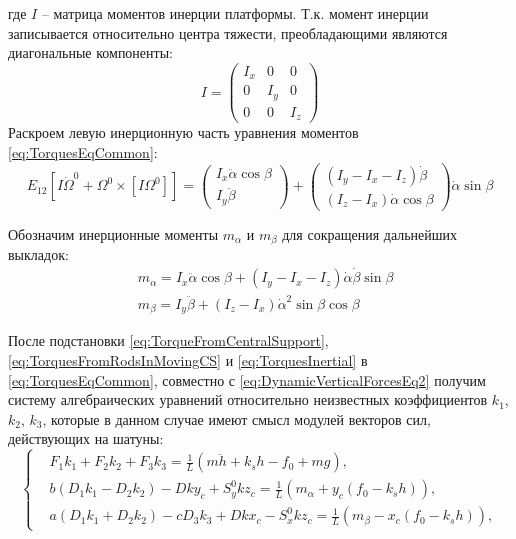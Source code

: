 где $I$ – матрица моментов инерции платформы. Т.к. момент инерции записывается относительно центра тяжести, преобладающими являются диагональные компоненты:
\begin{equation}
I = \begin{pmatrix}
I_x & 0 & 0 \\ 0 & I_y & 0 \\ 0 & 0 & I_z
\end{pmatrix}
\end{equation}
Раскроем левую инерционную часть уравнения моментов \ref{eq:TorquesEqCommon}:
\begin{equation}
\label{eq:TorquesEqLeftInertialPart}
E_{12}\left[I\dot{\Omega}^0 + \Omega^0 \times \left[I\Omega^0\right] \right] = \begin{pmatrix}I_x\ddot{\alpha}\cos{\beta} \\ I_y\ddot{\beta}\end{pmatrix} +
\begin{pmatrix}\left(I_y-I_x-I_z\right)\dot{\beta} \\ \left(I_z-I_x\right)\dot{\alpha}\cos{\beta}\end{pmatrix}\dot{\alpha}\sin{\beta}
\end{equation}

Обозначим инерционные моменты $m_{\alpha}$ и $m_\beta$ для сокращения дальнейших выкладок:
\begin{equation}
\label{eq:TorquesInertial}
\begin{aligned}
& m_{\alpha} = I_x\ddot{\alpha}\cos{\beta} + \left(I_y-I_x-I_z\right)\dot{\alpha}\dot{\beta}\sin{\beta} \\
& m_{\beta} = I_y\ddot{\beta} + \left(I_z-I_x\right)\dot{\alpha}^2\sin{\beta}\cos{\beta}
\end{aligned}
\end{equation}

После подстановки \ref{eq:TorqueFromCentralSupport}, \ref{eq:TorquesFromRodsInMovingCS} и \ref{eq:TorquesInertial} в \ref{eq:TorquesEqCommon}, совместно с \ref{eq:DynamicVerticalForcesEq2} получим систему алгебраических уравнений относительно неизвестных коэффициентов $k_1$, $k_2$, $k_3$, которые в данном случае имеют смысл модулей векторов сил, действующих на шатуны:
\begin{equation}
\label{eq:KoefsLinearSystem1}
\left\{
\begin{aligned}
& F_1k_1 + F_2k_2 + F_3k_3 = \frac{1}{L}\left(m\ddot{h}+k_sh-f_0+mg\right), \\
& b\left(D_1k_1-D_2k_2\right)-Dky_c + S_y^0kz_c = \frac{1}{L}\left(m_{\alpha} + y_c\left(f_0 - k_sh\right)\right), \\
& a\left(D_1k_1+D_2k_2\right)-cD_3k_3+Dkx_c-S_x^0kz_c = \frac{1}{L}\left(m_{\beta} - x_c\left(f_0 - k_sh\right)\right),
\end{aligned}
\right.
\end{equation}

